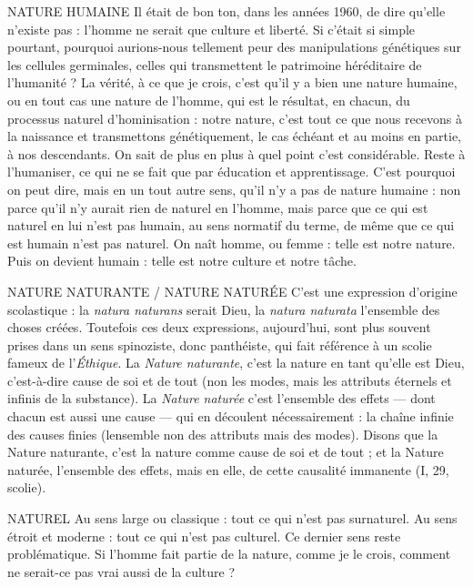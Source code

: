 NATURE HUMAINE Il était de bon ton, dans les années 1960, de dire
qu’elle n’existe pas : l’homme ne serait que culture et
liberté. Si c'était si simple pourtant, pourquoi aurions-nous tellement peur des
manipulations génétiques sur les cellules germinales, celles qui transmettent le
patrimoine héréditaire de l'humanité ? La vérité, à ce que je crois, c’est qu’il y
a bien une nature humaine, ou en tout cas une nature de l’homme, qui est le
résultat, en chacun, du processus naturel d’hominisation : notre nature, c’est
tout ce que nous recevons à la naissance et transmettons génétiquement, le cas
échéant et au moins en partie, à nos descendants. On sait de plus en plus à quel
point c’est considérable. Reste à l’humaniser, ce qui ne se fait que par éducation
et apprentissage. C’est pourquoi on peut dire, mais en un tout autre sens, qu’il
n'y a pas de nature humaine : non parce qu’il n’y aurait rien de naturel en
l’homme, mais parce que ce qui est naturel en lui n’est pas humain, au sens
normatif du terme, de même que ce qui est humain n’est pas naturel. On naît
homme, ou femme : telle est notre nature. Puis on devient humain : telle est
notre culture et notre tâche.

NATURE NATURANTE / NATURE NATURÉE C’est une expression d’origine scolastique : la {\it natura
naturans} serait Dieu, la {\it natura naturata} l'ensemble des choses créées. Toutefois
ces deux expressions, aujourd’hui, sont plus souvent prises dans un sens spinoziste,
donc panthéiste, qui fait référence à un scolie fameux de l’{\it Éthique}. La
{\it Nature naturante}, c’est la nature en tant qu’elle est Dieu, c’est-à-dire cause de
soi et de tout (non les modes, mais les attributs éternels et infinis de la substance).
La {\it Nature naturée} c’est l’ensemble des effets — dont chacun est aussi une
cause — qui en découlent nécessairement : la chaîne infinie des causes finies
(lensemble non des attributs mais des modes). Disons que la Nature naturante,
c’est la nature comme cause de soi et de tout ; et la Nature naturée,
l’ensemble des effets, mais en elle, de cette causalité immanente (I, 29, scolie).

NATUREL Au sens large ou classique : tout ce qui n’est pas surnaturel. Au
sens étroit et moderne : tout ce qui n’est pas culturel. Ce dernier
sens reste problématique. Si l’homme fait partie de la nature, comme je le crois,
comment ne serait-ce pas vrai aussi de la culture ?

